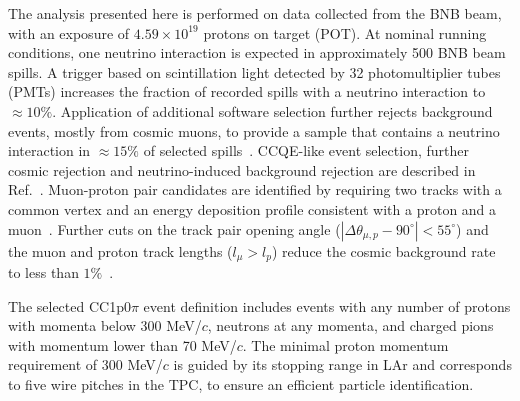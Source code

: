 \documentclass[aps,prl,showpacs,twocolumn,superscriptaddress,letterpaper,longbibliography]{revtex4-1}
\begin{document}
	
	The analysis presented here is performed on data collected from the BNB beam, with an exposure of $4.59 \times 10^{19}$ protons on target (POT). At nominal running conditions, one neutrino interaction is expected in approximately 500 BNB beam spills. A trigger based on scintillation light detected by 32 photomultiplier tubes (PMTs) increases the fraction of recorded spills with a neutrino interaction to $\approx 10 \%$. Application of additional software selection further rejects background events, mostly from cosmic muons, to provide a sample that contains a neutrino interaction in $\approx 15 \%$ of selected spills~\cite{Kaleko:2013eda,Adams:2018gbi}.  CCQE-like event selection, further cosmic rejection and neutrino-induced background rejection are described in Ref.~\cite{Adams:2018lzd}. Muon-proton pair candidates are identified by requiring two tracks with a common vertex and an energy deposition profile consistent with a proton and a muon~\cite{Adams:2016smi}. Further cuts on the track pair opening angle ($|\Delta \theta_{\mu,p} - 90^\circ| < 55^\circ$) and the muon and proton track lengths ($l_\mu > l_p$) reduce the cosmic background rate to less than $1 \%$~\cite{Adams:2018lzd}.
	
	
	

	
The selected CC1p0$\pi$ event definition includes events with any number of 
protons with momenta below 300 MeV/$c$, neutrons at any momenta, and charged pions with momentum lower than 70 MeV/$c$.
	The minimal proton momentum requirement of 300 MeV/$c$  is guided by its stopping range in LAr and corresponds to five wire pitches in the TPC, to ensure  an efficient particle identification.
	
\end{document}

